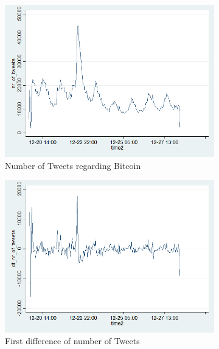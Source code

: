 \documentclass[a4paper,american,12pt]{article}
\begin{document}
\begin{spacing}{1.2}
\begin{figure}[H]
	\begin{subfigure}{.3\textwidth}
	\centering
	\includegraphics[width=1.12\textwidth]{stata_export_graphs/graph_plot_nr_tweets.png}
	\caption{Number of Tweets regarding Bitcoin}
	\end{subfigure}\hfill
	\begin{subfigure}{.3\textwidth}
	\centering
	\includegraphics[width=1.12\textwidth]{stata_export_graphs/graph_plot_df_nr_tweets.png}
	\caption{First difference of number of Tweets}
	\end{subfigure}\hfill
	\begin{subfigure}{.3\textwidth}
	\centering

\end{subfigure}
\end{figure}
\end{spacing}
\end{document}

